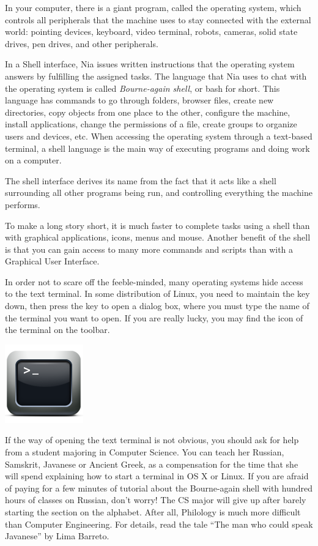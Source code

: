 \documentclass[a4paper,12pt]{book}
\begin{document}
In your computer, there is a giant
program, called the operating system, which controls
all peripherals that the machine uses to
stay connected with the external world:
pointing devices,  keyboard,
video terminal, robots, cameras, solid
state drives, pen drives, and other peripherals.

In a Shell interface, Nia issues written instructions
that the operating system answers by fulfilling the
assigned tasks. The language that Nia
uses to chat with the operating
system is called {\em Bourne-again shell}, or
bash for short. This language has
commands to go through folders, browser
files, create new directories, copy
objects from one place to the other,
configure the machine, install
applications, change the permissions
of a file, create groups to organize
users and devices, etc.
When accessing the operating system through
a text-based terminal, a shell language is the main way
of executing programs and doing work on a computer.

The shell interface derives its name from
the fact that it acts like a shell
surrounding all other programs being run,
and controlling everything the machine performs.

To make a long story short,
it is much faster to complete tasks
using a shell than with graphical applications,
icons, menus and mouse. Another benefit of the
shell is that you can gain access to many
more commands and scripts than with
a Graphical User Interface.

In order not to scare off the feeble-minded,
many operating systems hide access
to the text terminal. In some distribution
of Linux, you need to maintain the  key
down, then press the  key to open a
dialog box, where you must type the
name of the terminal you want to open.
If you are really lucky, you may find
the icon of the terminal  on the
toolbar.

\includegraphics[scale=0.8]{figs/terminal.png}

If the way of opening the text terminal
is not obvious, you should ask for help
from a student majoring in Computer Science.
You can teach her Russian, Samskrit, Javanese
or Ancient Greek, as a compensation
for the time that she will spend explaining
how to start a terminal in 
OS X or Linux. If you are afraid
of paying for a few minutes of tutorial
about the Bourne-again shell
with hundred hours of classes on
Russian, don't worry! The CS
major will give up after barely
starting the section on the alphabet. After all,
Philology is much more difficult
than Computer Engineering.
For details, read the tale ``The man who could speak
Javanese'' by Lima Barreto.
\end{document}
